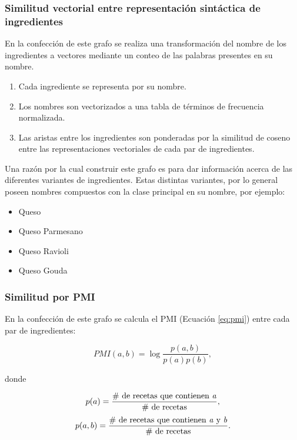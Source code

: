 \documentclass[
	a4paper, %
	10pt, %
	unnumberedsections, %
	twoside, %
]{LTJournalArticle}
\begin{document}
\subsubsection{Similitud vectorial entre representación sintáctica de ingredientes}

En la confección de este grafo se realiza una transformación del nombre de los ingredientes a vectores mediante
un conteo de las palabras presentes en su nombre.

\begin{enumerate}
	\item Cada ingrediente se representa por su nombre.
	\item Los nombres son vectorizados a una tabla de términos de frecuencia normalizada.
	\item Las aristas entre los ingredientes son ponderadas por la similitud de coseno entre las 
	representaciones vectoriales de cada par de ingredientes.
\end{enumerate}

Una razón por la cual construir este grafo es para dar información acerca de las diferentes variantes de ingredientes.
Estas distintas variantes, por lo general poseen nombres compuestos con la clase principal en su nombre, por ejemplo:

\begin{itemize}
	\item Queso
	\item Queso Parmesano
	\item Queso Ravioli
	\item Queso Gouda
\end{itemize}

\subsubsection{Similitud por PMI}

En la confección de este grafo se calcula el PMI \autocite{teng2012recipe} (Ecuación \ref{eq:pmi}) entre cada par de ingredientes:

\begin{equation}
	PMI(a, b) = \log \frac{p(a,b)}{p(a)p(b)},
	\label{eq:pmi}
\end{equation}

donde

\begin{equation*}
	p(a) = \frac{\text{\# de recetas que contienen \textit{a}}}{\text{\# de recetas}},
\end{equation*}
\begin{equation*}
	p(a,b) = \frac{\text{\# de recetas que contienen \textit{a} y \textit{b}}}{\text{\# de recetas}}.
\end{equation*}
\end{document}
